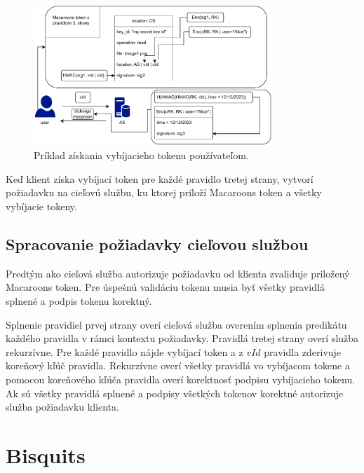 \begin{figure}
    \centerline{\includegraphics[width=0.8\textwidth]{images/user_request}}
    \caption[Získanie vybíjacieho tokenu používateľom]{Príklad získania vybíjacieho tokenu používateľom.}
    \label{fig:user_request}
\end{figure}

Keď klient získa vybíjací token pre každé pravidlo tretej strany, vytvorí požiadavku na cieľovú službu, ku ktorej priloží Macaroons token a všetky vybíjacie tokeny.

\subsection{Spracovanie požiadavky cieľovou službou}

Predtým ako cieľová služba autorizuje požiadavku od klienta zvaliduje priložený Macaroons token. Pre úspešnú validáciu tokenu musia byť všetky pravidlá splnené a podpis tokenu korektný.

Splnenie pravidiel prvej strany overí cieľová služba overením splnenia predikátu každého pravidla v rámci kontextu požiadavky. Pravidlá tretej strany overí služba rekurzívne. Pre každé pravidlo nájde vybíjací token a z $vId$ pravidla zderivuje koreňový kľúč pravidla. Rekurzívne overí všetky pravidlá vo vybíjacom tokene a pomocou koreňového kľúča pravidla overí korektnosť podpisu vybíjacieho tokenu. Ak sú všetky pravidlá splnené a podpisy všetkých tokenov korektné autorizuje služba požiadavku klienta.

\section{Bisquits}

